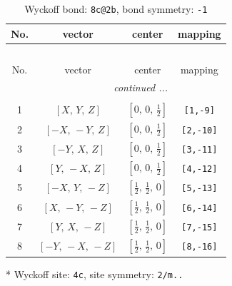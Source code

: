 \documentclass[fleqn,8pt]{jsarticle}
\begin{document}
\renewcommand{\arraystretch}{1.2}
\begin{longtable}{cccc}
\caption{Wyckoff bond: {\tt 8c@2b}, bond symmetry: {\tt -1}}
 \\
 \hline \hline
No. & vector & center & mapping \\ \hline \endfirsthead

\multicolumn{3}{l}{\tablename\ \thetable{}} \\
 \hline \hline
No. & vector & center & mapping \\ \hline \endhead

 \hline \hline
\multicolumn{3}{r}{\footnotesize\it continued ...} \\ \endfoot

 \hline \hline
\multicolumn{3}{r}{} \\ \endlastfoot

1 & $\left[ X,\, Y,\, Z \right]$ & $\left[ 0,\, 0,\, \frac{1}{2} \right]$ & {\tt [1,-9]} \\ \hline
2 & $\left[ - X,\, - Y,\, Z \right]$ & $\left[ 0,\, 0,\, \frac{1}{2} \right]$ & {\tt [2,-10]} \\ \hline
3 & $\left[ - Y,\, X,\, Z \right]$ & $\left[ 0,\, 0,\, \frac{1}{2} \right]$ & {\tt [3,-11]} \\ \hline
4 & $\left[ Y,\, - X,\, Z \right]$ & $\left[ 0,\, 0,\, \frac{1}{2} \right]$ & {\tt [4,-12]} \\ \hline
5 & $\left[ - X,\, Y,\, - Z \right]$ & $\left[ \frac{1}{2},\, \frac{1}{2},\, 0 \right]$ & {\tt [5,-13]} \\ \hline
6 & $\left[ X,\, - Y,\, - Z \right]$ & $\left[ \frac{1}{2},\, \frac{1}{2},\, 0 \right]$ & {\tt [6,-14]} \\ \hline
7 & $\left[ Y,\, X,\, - Z \right]$ & $\left[ \frac{1}{2},\, \frac{1}{2},\, 0 \right]$ & {\tt [7,-15]} \\ \hline
8 & $\left[ - Y,\, - X,\, - Z \right]$ & $\left[ \frac{1}{2},\, \frac{1}{2},\, 0 \right]$ & {\tt [8,-16]} \\
\end{longtable}
* Wyckoff site: {\tt 4c}, site symmetry: {\tt 2/m..}
\renewcommand{\arraystretch}{1.2}
\end{document}

